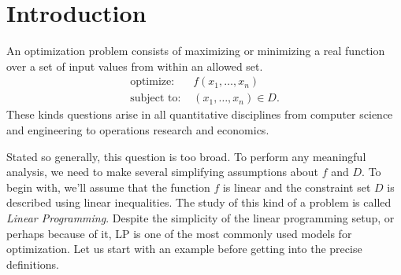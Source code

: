 \documentclass[
]{book}
\theoremstyle{definition}
\theoremstyle{definition}
\theoremstyle{definition}
\theoremstyle{definition}
\theoremstyle{remark}
\begin{document}
\hypertarget{introduction}{%
\chapter{Introduction}\label{introduction}}

An optimization problem consists of maximizing or minimizing a real function over a set of input values from within an allowed set.
\begin{align*}
\mbox{optimize: } & f(x_1, \dots, x_n) \\
\mbox{subject to: } & (x_1, \dots, x_n) \in D.
\end{align*}
These kinds questions arise in all quantitative disciplines from computer science and engineering to operations research and economics.

Stated so generally, this question is too broad. To perform any meaningful analysis, we need to make several simplifying assumptions about \(f\) and \(D\). To begin with, we'll assume that the function \(f\) is linear and the constraint set \(D\) is described using linear inequalities. The study of this kind of a problem is called \emph{Linear Programming}. Despite the simplicity of the linear programming setup, or perhaps because of it, LP is one of the most commonly used models for optimization. Let us start with an example before getting into the precise definitions.
\end{document}
